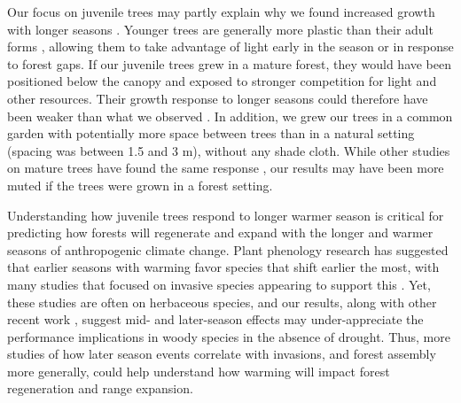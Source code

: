 \documentclass{article}\usepackage[]{graphicx}\usepackage[]{xcolor}
\begin{document}
Our focus on juvenile trees may partly explain why we found increased growth with longer seasons \citep{augspurger_differences_2003,sweeneyComparisonTimingSpring2024}. Younger trees are generally more plastic than their adult forms \citep{augspurger_differences_2003,way_photoperiod_2015}, allowing them to take advantage of light early in the season or in response to forest gaps. If our juvenile trees grew in a mature forest, they would have been positioned below the canopy and exposed to stronger competition for light and other resources. Their growth response to longer seasons could therefore have been weaker than what we observed
\citep{cleland_effects_2024,augspurger_differences_2003,sweeneyComparisonTimingSpring2024,polgar_leafout_2011}. In addition, we grew our trees in a common garden with potentially more space between trees than in a natural setting (spacing was between 1.5 and 3 m), without any shade cloth. While other studies on mature trees have found the same response \citep{finziCarbonBudgetHarvard2020}, our results may have been more muted if the trees were grown in a forest setting. 

Understanding how juvenile trees respond to longer warmer season is critical for predicting how forests will regenerate and expand with the longer and warmer seasons of anthropogenic climate change. Plant phenology research has suggested that earlier seasons with warming favor species that shift earlier the most, with many studies that focused on invasive species appearing to support this \citep{wolkovich_temperaturedependent_2013,zettlemoyer_phenology_2019}. Yet, these studies are often on herbaceous species, and our results, along with other recent work \citep{zani_increased_2020,zohner_effect_2023}, suggest mid- and later-season effects may under-appreciate the performance implications in woody species in the absence of drought. Thus, more studies of how later season events correlate with invasions, and forest assembly more generally, could help understand how warming will impact forest regeneration and range expansion.
\end{document}
